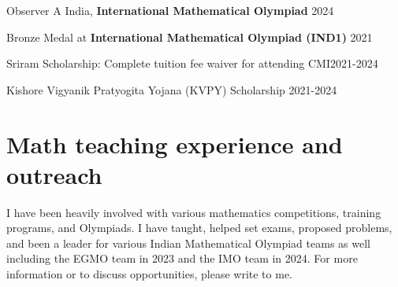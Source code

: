 \documentclass[margin,line, 10pt]{res}
\begin{document}
\begin{resume}
Observer A India, {\bf International Mathematical Olympiad} \hfill 2024

\vspace*{-2.5mm}
Bronze Medal at {\bf International Mathematical Olympiad (IND1)} \hfill 2021

\vspace*{-2.5mm}
Sriram Scholarship: Complete tuition fee waiver for attending CMI\hfill 2021-2024

\vspace*{-2.5mm}
Kishore Vigyanik Pratyogita Yojana (KVPY) Scholarship \hfill 2021-2024

\section{\sc Math teaching experience and outreach}
I have been heavily involved with various mathematics competitions, training programs, and Olympiads. I have taught, helped set exams, proposed problems, and been a leader for various Indian Mathematical Olympiad teams as well including the EGMO team in 2023 and the IMO team in 2024. For more information or to discuss opportunities, please write to me.



\end{resume}
\thispagestyle{lastpage}
\end{document}
